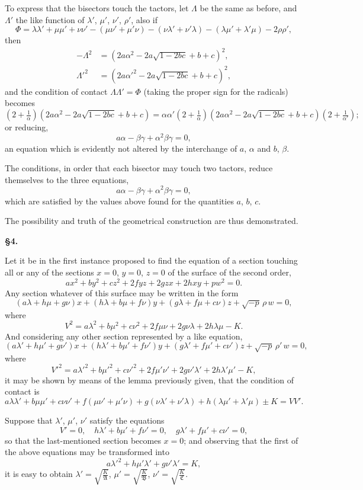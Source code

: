 \documentclass[11pt,a4paper]{book}
\begin{document}
To express that the bisectors touch the tactors, let $\Lambda$ be the same as before, and $\Lambda'$ the like function of $\lambda'$, $\mu'$, $\nu'$, $\rho'$, also if
\[
\Phi = \lambda\lambda' + \mu\mu' + \nu\nu' - (\mu\nu'+\mu'\nu) - (\nu\lambda'+\nu'\lambda) - (\lambda\mu'+\lambda'\mu) - 2\rho\rho',
\]
then
\begin{align*}
-\Lambda^2 &= (2a\alpha^2 - 2a\sqrt{1-2bc} + b + c)^2,\\
\Lambda'^2 &= (2a\alpha'^2 - 2a\sqrt{1-2bc} + b + c)^2,
\end{align*}
and the condition of contact $\Lambda\Lambda' = \Phi$ (taking the proper sign for the radicals) becomes
\[
(2+\tfrac{1}{\alpha})(2a\alpha^2 - 2a\sqrt{1-2bc} + b + c) = \alpha\alpha'(2+\tfrac{1}{\alpha})(2a\alpha^2 - 2a\sqrt{1-2bc} + b + c)(2+\tfrac{1}{\alpha'});
\]
or reducing,
\[
a\alpha - \beta\gamma + \alpha^2\beta\gamma = 0,
\]
an equation which is evidently not altered by the interchange of $a$, $\alpha$ and $b$, $\beta$.

The conditions, in order that each bisector may touch two tactors, reduce themselves to the three equations,
\[
a\alpha - \beta\gamma + \alpha^2\beta\gamma = 0,
\]
which are satisfied by the values above found for the quantities $a$, $b$, $c$.

The possibility and truth of the geometrical construction are thus demonstrated.


\newpage
\setcounter{page}{64}

\noindent\textbf{\S 4.}

Let it be in the first instance proposed to find the equation of a section touching all or any of the sections $x=0$, $y=0$, $z=0$ of the surface of the second order,
\[
ax^2+by^2+cz^2+2fyz+2gzx+2hxy+pw^2=0.
\]
Any section whatever of this surface may be written in the form
\[
(a\lambda+h\mu+g\nu)x + (h\lambda+b\mu+f\nu)y + (g\lambda+f\mu+c\nu)z + \sqrt{-p}\,\rho\,w = 0,
\]
where
\[
V^2 = a\lambda^2 + b\mu^2 + c\nu^2 + 2f\mu\nu + 2g\nu\lambda + 2h\lambda\mu - K.
\]
And considering any other section represented by a like equation,
\[
(a\lambda'+h\mu'+g\nu')x + (h\lambda'+b\mu'+f\nu')y + (g\lambda'+f\mu'+c\nu')z + \sqrt{-p}\,\rho'\,w = 0,
\]
where
\[
V'^2 = a\lambda'^2 + b\mu'^2 + c\nu'^2 + 2f\mu'\nu' + 2g\nu'\lambda' + 2h\lambda'\mu' - K,
\]
it may be shown by means of the lemma previously given, that the condition of contact is
\[
a\lambda\lambda'+b\mu\mu'+c\nu\nu'+f(\mu\nu'+\mu'\nu)+g(\nu\lambda'+\nu'\lambda)+h(\lambda\mu'+\lambda'\mu) \pm K = VV'.
\]

Suppose that $\lambda'$, $\mu'$, $\nu'$ satisfy the equations
\[
V' = 0, \quad h\lambda'+b\mu'+f\nu' = 0, \quad g\lambda'+f\mu'+c\nu' = 0,
\]
so that the last-mentioned section becomes $x=0$; and observing that the first of the above equations may be transformed into
\[
a\lambda'^2+h\mu'\lambda'+g\nu'\lambda' = K,
\]
it is easy to obtain $\lambda'=\sqrt{\tfrac{K}{\mathfrak{A}}}$, $\mu'=\sqrt{\tfrac{K}{\mathfrak{B}}}$, $\nu'=\sqrt{\tfrac{K}{\mathfrak{C}}}$.
\end{document}
